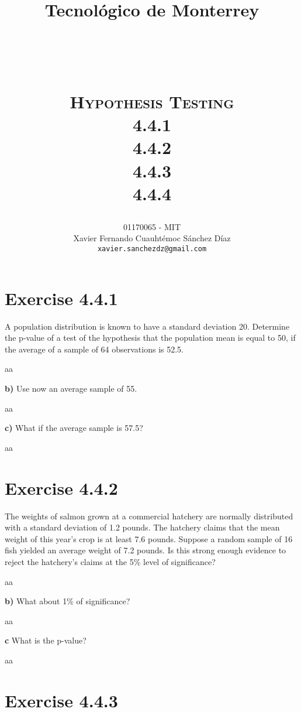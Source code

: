 \documentclass[titlepage, letterpaper, fleqn]{article}
\title{
\vspace{1in}
\textbf{Tecnológico de Monterrey} \\
\vspace{0.5in}
\textmd{\mahclass} \\
\large{\textit{\mahteacher}} \\
\vspace{0.5in}
\textsc{\mahtitle}\\
\textsc{Hypothesis Testing}\\
\textsc{4.4.1}\\
\textsc{4.4.2}\\
\textsc{4.4.3}\\
\textsc{4.4.4}\\
\author{01170065  - MIT \\
Xavier Fernando Cuauhtémoc Sánchez Díaz \\
\texttt{xavier.sanchezdz@gmail.com}}
\date{\mahdate}
}
\newcommand{\spacepls}{\vspace{5mm}}
\begin{document}
\begin{titlepage}
\maketitle
\end{titlepage}

%
%

\section{Exercise 4.4.1}

{\large A population distribution is known to have a standard deviation 20.
Determine the p-value of a test of the hypothesis that the population mean is equal to 50, if the average of a sample of 64 observations is 52.5.}

aa

\spacepls

{\large \textbf{b)} Use now an average sample of 55.}

aa

\spacepls

{\large \textbf{c)} What if the average sample is 57.5?}

aa

\spacepls

\section{Exercise 4.4.2}

{\large The weights of salmon grown at a commercial hatchery are normally distributed with a standard deviation of 1.2 pounds.
The hatchery claims that the mean weight of this year's crop is at least 7.6 pounds.
Suppose a random sample of 16 fish yielded an average weight of 7.2 pounds.
Is this strong enough evidence to reject the hatchery's claims at the 5\% level of significance?}

aa

\spacepls

{\large \textbf{b)} What about 1\% of significance?}

aa

\spacepls

{\large \textbf{c} What is the p-value?}

aa

\spacepls

\section{Exercise 4.4.3}
\end{document}

